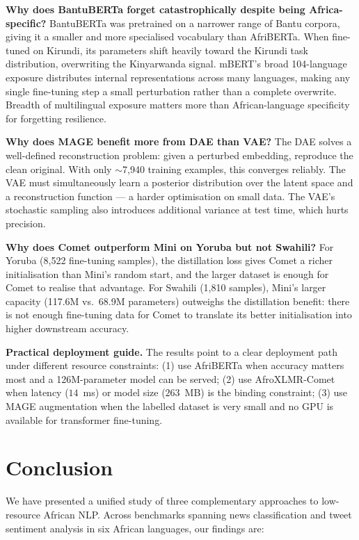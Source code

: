 \documentclass[conference]{IEEEtran}
\begin{document}
\textbf{Why does BantuBERTa forget catastrophically despite being Africa-specific?}
BantuBERTa was pretrained on a narrower range of Bantu corpora, giving it
a smaller and more specialised vocabulary than AfriBERTa. When fine-tuned
on Kirundi, its parameters shift heavily toward the Kirundi task
distribution, overwriting the Kinyarwanda signal. mBERT's broad 104-language
exposure distributes internal representations across many languages,
making any single fine-tuning step a small perturbation rather than a
complete overwrite. Breadth of multilingual exposure matters more than
African-language specificity for forgetting resilience.

\textbf{Why does MAGE benefit more from DAE than VAE?}
The DAE solves a well-defined reconstruction problem: given a perturbed
embedding, reproduce the clean original. With only $\sim$7,940 training
examples, this converges reliably. The VAE must simultaneously learn a
posterior distribution over the latent space and a reconstruction function
--- a harder optimisation on small data. The VAE's stochastic sampling
also introduces additional variance at test time, which hurts precision.

\textbf{Why does Comet outperform Mini on Yoruba but not Swahili?}
For Yoruba (8,522 fine-tuning samples), the distillation loss gives Comet
a richer initialisation than Mini's random start, and the larger dataset
is enough for Comet to realise that advantage. For Swahili (1,810 samples),
Mini's larger capacity (117.6M vs.\ 68.9M parameters) outweighs the
distillation benefit: there is not enough fine-tuning data for Comet to
translate its better initialisation into higher downstream accuracy.

\textbf{Practical deployment guide.}
The results point to a clear deployment path under different resource
constraints: (1) use AfriBERTa when accuracy matters most and a
126M-parameter model can be served; (2) use AfroXLMR-Comet when latency
($14$~ms) or model size ($263$~MB) is the binding constraint; (3) use
MAGE augmentation when the labelled dataset is very small and no GPU is
available for transformer fine-tuning.

\section{Conclusion}\label{sec:conclusion}

We have presented a unified study of three complementary approaches to
low-resource African NLP. Across benchmarks spanning news classification
and tweet sentiment analysis in six African languages, our findings are:
\end{document}
